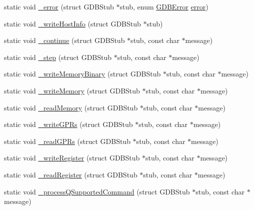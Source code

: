 \begin{DoxyCompactItemize}
\item 
static void \mbox{\hyperlink{gdb-stub_8c_a2efa3a2574e849468b6c893d8fae58ca}{\+\_\+error}} (struct G\+D\+B\+Stub $\ast$stub, enum \mbox{\hyperlink{gdb-stub_8c_a5bd3541bce743d620bce1273a43416dd}{G\+D\+B\+Error}} \mbox{\hyperlink{minigzip_8c_aee763da2c1c9da197307bad1d009513d}{error}})
\item 
static void \mbox{\hyperlink{gdb-stub_8c_abf80181e6f4f0b39c329b802fa1cae95}{\+\_\+write\+Host\+Info}} (struct G\+D\+B\+Stub $\ast$stub)
\item 
static void \mbox{\hyperlink{gdb-stub_8c_ade267028ab6c52118e785970aecd3fd9}{\+\_\+continue}} (struct G\+D\+B\+Stub $\ast$stub, const char $\ast$message)
\item 
static void \mbox{\hyperlink{gdb-stub_8c_ae28066e90628c8bf0560863573506b06}{\+\_\+step}} (struct G\+D\+B\+Stub $\ast$stub, const char $\ast$message)
\item 
static void \mbox{\hyperlink{gdb-stub_8c_a57b8f62dd442a177c1cca999ec2010a4}{\+\_\+write\+Memory\+Binary}} (struct G\+D\+B\+Stub $\ast$stub, const char $\ast$message)
\item 
static void \mbox{\hyperlink{gdb-stub_8c_a4e6946316c1b882a919c3839f12b6c85}{\+\_\+write\+Memory}} (struct G\+D\+B\+Stub $\ast$stub, const char $\ast$message)
\item 
static void \mbox{\hyperlink{gdb-stub_8c_aaf71acf340ddecdd40415bcd393b31cb}{\+\_\+read\+Memory}} (struct G\+D\+B\+Stub $\ast$stub, const char $\ast$message)
\item 
static void \mbox{\hyperlink{gdb-stub_8c_aa692d1765e005bcc6fa510f74a85c598}{\+\_\+write\+G\+P\+Rs}} (struct G\+D\+B\+Stub $\ast$stub, const char $\ast$message)
\item 
static void \mbox{\hyperlink{gdb-stub_8c_ab27c309a3277a098b285f7b0e65d4372}{\+\_\+read\+G\+P\+Rs}} (struct G\+D\+B\+Stub $\ast$stub, const char $\ast$message)
\item 
static void \mbox{\hyperlink{gdb-stub_8c_aa8d43b0007b4cac1d3dcad6212b8406e}{\+\_\+write\+Register}} (struct G\+D\+B\+Stub $\ast$stub, const char $\ast$message)
\item 
static void \mbox{\hyperlink{gdb-stub_8c_ab3eabf8dd23cecb74255396e87e72453}{\+\_\+read\+Register}} (struct G\+D\+B\+Stub $\ast$stub, const char $\ast$message)
\item 
static void \mbox{\hyperlink{gdb-stub_8c_aa885c9605db7de6ec89abaf7c094c61f}{\+\_\+process\+Q\+Supported\+Command}} (struct G\+D\+B\+Stub $\ast$stub, const char $\ast$message)
\item 

\end{DoxyCompactItemize}
